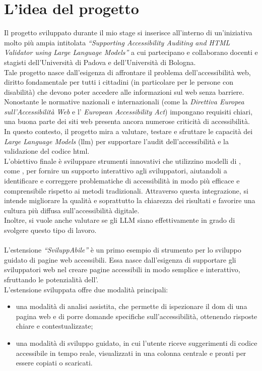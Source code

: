 \section{L'idea del progetto}
\noindent Il progetto sviluppato durante il mio stage si inserisce all’interno di un’iniziativa molto più ampia intitolata \textit{“Supporting Accessibility Auditing and HTML Validator using Large Language Models”} a cui partecipano e collaborano docenti e stagisti dell’Università di Padova e dell’Università di Bologna.\\
Tale progetto nasce dall’esigenza di affrontare il problema dell’accessibilità web, diritto fondamentale per tutti i cittadini (in particolare per le persone con disabilità) che devono poter accedere alle informazioni sul web senza barriere.\\
Nonostante le normative nazionali e internazionali (come la \textit{Direttiva Europea sull'Accessibilità Web} e l' \textit{European Accessibility Act}) impongano requisiti chiari, una buona parte dei siti web presenta ancora numerose criticità di accessibilità. \cite{site:UE_accessibility_act}\\
In questo contesto, il progetto mira a valutare, testare e sfruttare le capacità dei \textit{Large Language Models} (\acrshort{llm}) per supportare l’audit dell’accessibilità e la validazione del codice \acrshort{html}.\\
L’obiettivo finale è sviluppare strumenti innovativi che utilizzino modelli di , come , per fornire un supporto interattivo agli sviluppatori, aiutandoli a identificare e correggere problematiche di accessibilità in modo più efficace e comprensibile rispetto ai metodi tradizionali. Attraverso questa integrazione, si intende migliorare la qualità e soprattutto la chiarezza dei risultati e favorire una cultura più diffusa sull’accessibilità digitale.\\ Inoltre, si vuole anche valutare se gli LLM siano effettivamente in grado di svolgere questo tipo di lavoro.\\
\\
L’estensione \textit{“SviluppAbile”} è un primo esempio di strumento per lo sviluppo guidato di pagine web accessibili.
Essa nasce dall’esigenza di supportare gli sviluppatori web nel creare pagine accessibili in modo semplice e interattivo, sfruttando le potenzialità dell’.\\
L’estensione  sviluppata offre due modalità principali: \begin{itemize}
    \item una modalità di analisi assistita, che permette di ispezionare il \acrshort{dom} di una pagina web e di porre domande specifiche sull’accessibilità, ottenendo risposte chiare e contestualizzate; 
    \item una modalità di sviluppo guidato, in cui l’utente riceve suggerimenti di codice accessibile in tempo reale, visualizzati in una colonna centrale e pronti per essere copiati o scaricati.
\end{itemize}
